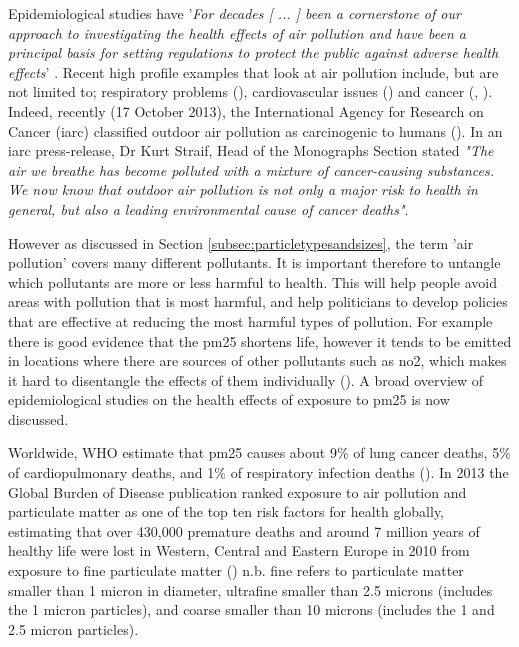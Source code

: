 Epidemiological studies have '\textit{For decades [ ... ] been a cornerstone of our approach to investigating the health effects of air pollution and have been a principal basis for setting regulations to protect the public against adverse health effects}' \cite{Zeger2000}. Recent high profile examples that look at air pollution include, but are not limited to; respiratory problems (\cite{Peacock2011}), cardiovascular issues (\cite{Brook2010}) and cancer (\cite{Iii2012}, \cite{loomis2013}). Indeed, recently (17 October 2013), the International Agency for Research on Cancer (\gls{iarc}) classified outdoor air pollution as carcinogenic to humans (\cite{loomis2013}). In an \gls{iarc} press-release, Dr Kurt Straif, Head of the Monographs Section stated \textit{"The air we breathe has become polluted with a mixture of cancer-causing substances. We now know that outdoor air pollution is not only a major risk to health in general, but also a leading environmental cause of cancer deaths"}.


However as discussed in Section \ref{subsec:particletypesandsizes}, the term 'air pollution' covers many different pollutants. It is important therefore to untangle which pollutants are more or less harmful to health. This will help people avoid areas with pollution that is most harmful, and help politicians to develop policies that are effective at reducing the most harmful types of pollution. For example there is good evidence that the \gls{pm25} shortens life, however it tends to be emitted in locations where there are sources of other pollutants such as \gls{no2}, which makes it hard to disentangle the effects of them individually (\cite{CommitteeontheMedicalEffectsofAirPollutants2018}). A broad overview of epidemiological studies on the health effects of exposure to \gls{pm25} is now discussed.

Worldwide, WHO estimate that \gls{pm25} causes about 9\% of lung cancer deaths, 5\% of cardiopulmonary deaths, and 1\% of respiratory infection deaths (\cite{WorldHealthOrganization2012}). In 2013 the Global Burden of Disease publication ranked exposure to air pollution and particulate matter as one of the top ten risk factors for health globally, estimating that over 430,000 premature deaths and around 7 million years of healthy life were lost in Western, Central and Eastern Europe in 2010 from exposure to fine particulate matter (\cite{Brauer2012}) n.b. fine refers to particulate matter smaller than 1 micron in diameter, ultrafine smaller than 2.5 microns (includes the 1 micron particles), and coarse smaller than 10 microns (includes the 1 and 2.5 micron particles). 

